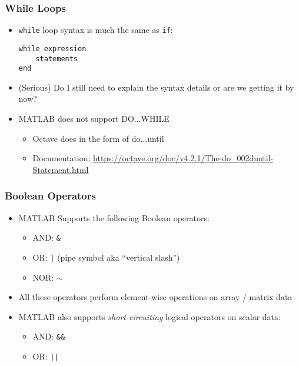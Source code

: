 \documentclass[14pt]{beamer}
\begin{document}
\begin{frame}[fragile]
\frametitle{While Loops}
\begin{itemize}
\item \texttt{while} loop syntax is much the same as \texttt{if}:
\begin{lstlisting}[style=pseudo]
while expression
    statements
end
\end{lstlisting}
\item (Serious) Do I still need to explain the syntax details or are we getting it by now?
\item MATLAB does not support DO...WHILE
	\begin{itemize}
		\item Octave does in the form of do...until
		\item Documentation: \url{https://octave.org/doc/v4.2.1/The-do_002duntil-Statement.html}
	\end{itemize}
\end{itemize}
\end{frame}

\begin{frame}
\frametitle{Boolean Operators}
\begin{itemize}
\item MATLAB Supports the following Boolean operators:
	\begin{itemize}
		\item AND: \texttt{\&}
		\item OR: \texttt{|} (pipe symbol aka ``vertical slash'')
		\item NOR: \texttt{$\sim$}
	\end{itemize}
\item All these operators perform element-wise operations on array / matrix data
\item MATLAB also supports \textit{short-circuiting} logical operators on scalar data:
	\begin{itemize}
		\item AND: \texttt{\&\&}
		\item OR: \texttt{||}
	\end{itemize}
\end{itemize}
\end{frame}
\end{document}
